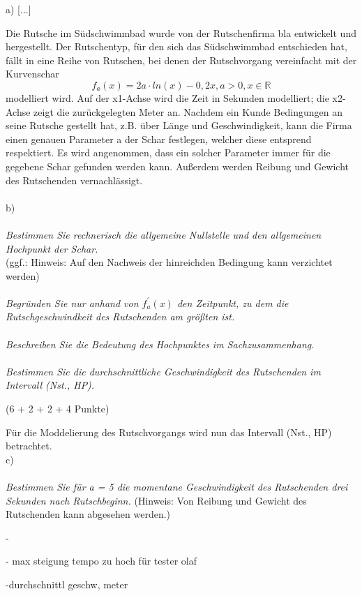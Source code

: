 \documentclass{article}
\begin{document}
a) [...]
\vspace{1cm}


Die Rutsche im Südschwimmbad wurde von der Rutschenfirma bla entwickelt und hergestellt. Der Rutschentyp, für den sich das Südschwimmbad entschieden hat, fällt in eine Reihe von Rutschen, bei denen der Rutschvorgang vereinfacht mit der Kurvenschar 
$$f_{a}(x) = 2a \cdot ln(x) - 0,2x, a > 0, x 	\in \mathbb{R}$$
modelliert wird. Auf der x1-Achse wird die Zeit in Sekunden modelliert; die x2-Achse zeigt die zurückgelegten Meter an. Nachdem ein Kunde Bedingungen an seine Rutsche gestellt hat, z.B. über Länge und Geschwindigkeit, kann die Firma einen genauen Parameter a der Schar festlegen, welcher diese entsprend respektiert. Es wird angenommen, dass ein solcher Parameter immer für die gegebene Schar gefunden werden kann. Außerdem werden Reibung und Gewicht des Rutschenden vernachlässigt.\\
\vspace{1cm}\\
b) \\
\vspace{0.05cm}\\
\textit{Bestimmen Sie rechnerisch die allgemeine Nullstelle und den allgemeinen Hochpunkt der Schar.}\\ 
(ggf.: Hinweis: Auf den Nachweis der hinreichden Bedingung kann verzichtet werden)\\
\vspace{0.05cm}\\
\textit{Begründen Sie nur anhand von $f^{\prime}_{a}(x)$ den Zeitpunkt, zu dem die Rutschgeschwindkeit des Rutschenden am größten ist.}\\
\vspace{0.05cm}\\
\textit{Beschreiben Sie die Bedeutung des Hochpunktes im Sachzusammenhang.}\\
\vspace{0.05cm}\\
\textit{Bestimmen Sie die durchschnittliche Geschwindigkeit des Rutschenden im Intervall (Nst., HP).}

{\raggedleft(6 + 2 + 2 + 4 Punkte)\\\vspace{1cm}\par}

Für die Moddelierung des Rutschvorgangs wird nun das Intervall (Nst., HP) betrachtet.
\vspace{1cm}\\
c)\\
\vspace{0.05cm}\\
\textit{Bestimmen Sie für a = 5 die momentane Geschwindigkeit des Rutschenden drei Sekunden nach Rutschbeginn.} (Hinweis: Von Reibung und Gewicht des Rutschenden kann abgesehen werden.)



\vspace{4cm}
- 

- max steigung tempo zu hoch für tester olaf

-durchschnittl geschw, meter
\end{document}
